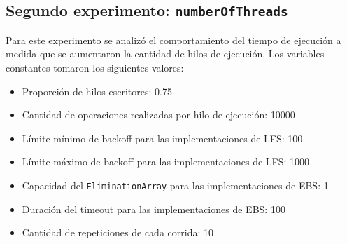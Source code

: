 \subsection{Segundo experimento: \texttt{numberOfThreads}}
Para este experimento se analizó el comportamiento del tiempo de ejecución a medida que se aumentaron la cantidad de hilos de ejecución. Los variables constantes tomaron los siguientes valores:

\begin{itemize}
    \item Proporción de hilos escritores: 0.75
    \item Cantidad de operaciones realizadas por hilo de ejecución: 10000
    \item Límite mínimo de backoff para las implementaciones de LFS: 100
    \item Límite máximo de backoff para las implementaciones de LFS: 1000
    \item Capacidad del \texttt{EliminationArray} para las implementaciones de EBS: 1
    \item Duración del timeout para las implementaciones de EBS: 100
    \item Cantidad de repeticiones de cada corrida: 10
\end{itemize}

